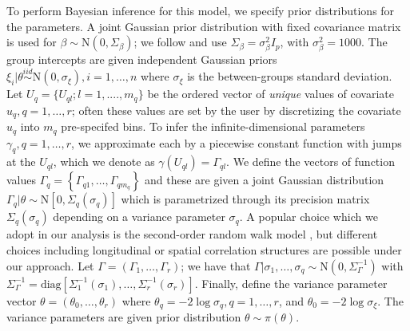 \documentclass[]{article}
\begin{document}
To perform Bayesian inference for this model, we specify prior distributions for the parameters. A joint Gaussian prior distribution with fixed covariance matrix is used for $\beta {\sim}  \text{N}(0,\Sigma_\beta)$; we follow \citet{casecross} and use $\Sigma_{\beta} = \sigma^{2}_{\beta}I_{p}$, with $\sigma^{2}_{\beta} = 1000$. The group intercepts are given independent Gaussian priors $\xi_{i} | \theta \stackrel{iid}{\sim} \text{N}(0,\sigma_{\xi}),i = 1,\ldots,n$ where $\sigma_{\xi}$ is the between-groups standard deviation. Let $U_{q} = \{U_{ql};l = 1, ...., m_q\}$ be the ordered vector of \textit{unique} values of covariate $u_q,q = 1,\ldots,r$; often these values are set by the user by discretizing the covariate $u_q$ into $m_q$ pre-specifed bins. To infer the infinite-dimensional parameters $\gamma_{q},q = 1,\ldots,r$, we approximate each by a piecewise constant function with jumps at the $U_{ql}$, which we denote as $\gamma(U_{ql}) = \Gamma_{ql}$. We define the vectors of function values $\Gamma_{q} = \left\{ \Gamma_{q1},\ldots,\Gamma_{qm_{q}}\right\}$ and these are given a joint Gaussian distribution $\Gamma_{q}|\theta\sim\text{N}\left[ 0,\Sigma_{q}(\sigma_{q})\right]$ which is parametrized through its precision matrix $\Sigma_{q}(\sigma_{q})$ depending on a variance parameter $\sigma_{q}$. A popular choice which we adopt in our analysis is the second-order random walk model \citep{rw2}, but different choices including longitudinal or spatial correlation structures are possible under our approach. Let $\Gamma = (\Gamma_{1},\ldots,\Gamma_{r})$; we have that $\Gamma|\sigma_{1},\ldots,\sigma_{q}\sim\text{N}\left( 0,\Sigma^{-1}_{\Gamma}\right)$ with $\Sigma^{-1}_{\Gamma} = \text{diag}\left[ \Sigma_{1}^{-1}(\sigma_{1}),\ldots,\Sigma_{r}^{-1}(\sigma_{r})\right]$. Finally, define the variance parameter vector $\theta = (\theta_{0},\ldots,\theta_{r})$ where $\theta_{q} = -2\log\sigma_{q},q = 1,\ldots,r$, and $\theta_{0} = -2\log\sigma_{\xi}$. The variance parameters are given prior distribution $\theta \sim \pi(\theta)$. 
\end{document}
